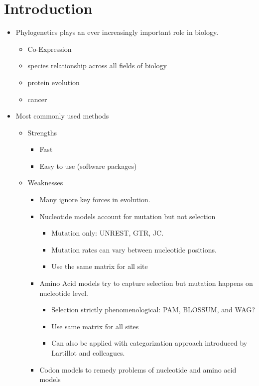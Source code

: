 \documentclass[12pt]{article}
\begin{document}
\section*{Introduction}
\begin{itemize}
	\item Phylogenetics plays an ever increasingly important role in biology.
	\begin{itemize}
		\item Co-Expression
		\item species relationship across all fields of biology
		\item protein evolution
		\item cancer
	\end{itemize}
	\item Most commonly used methods
	\begin{itemize}
		\item Strengths
		\begin{itemize}
			\item Fast
			\item Easy to use (software packages)
		\end{itemize}
		\item Weaknesses
		\begin{itemize}
			\item Many ignore key forces in evolution.
			\item Nucleotide models account for mutation but not selection
			\begin{itemize}
				\item Mutation only: UNREST, GTR, JC.
				\item Mutation rates can vary between nucleotide positions.
				\item Use the same matrix for all site
			\end{itemize}
			\item Amino Acid models try to capture selection but mutation happens on nucleotide level.
			\begin{itemize}
				\item Selection strictly phenomenological: PAM, BLOSSUM, and WAG?
				\item Use same matrix for all sites
				\item Can also be applied with categorization approach introduced by Lartillot and colleagues.
			\end{itemize}
			\item Codon models to remedy problems of nucleotide and amino acid models
			\begin{itemize}

\end{itemize}
\end{itemize}
\end{itemize}
\end{itemize}
\end{document}
